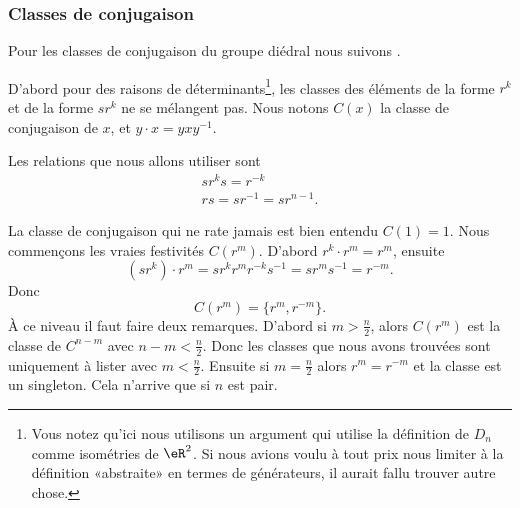 \subsubsection{Classes de conjugaison}
\label{subsubsecZQnBcgo}

Pour les classes de conjugaison du groupe diédral nous suivons \cite{HRIMAJJ}.

D'abord pour des raisons de déterminants\footnote{Vous notez qu'ici nous utilisons un argument qui utilise la définition de \( D_n\) comme isométries de \( \eR^2\). Si nous avions voulu à tout prix nous limiter à la définition «abstraite» en termes de générateurs, il aurait fallu trouver autre chose.}, les classes des éléments de la forme \( r^k\) et de la forme \( sr^k\) ne se mélangent pas. Nous notons \( C(x)\) la classe de conjugaison de \( x\), et \( y\cdot x=yxy^{-1}\).

Les relations que nous allons utiliser sont
\begin{subequations}
    \begin{align}
        sr^ks=r^{-k}\\
        rs=sr^{-1}=sr^{n-1}.
    \end{align}
\end{subequations}

La classe de conjugaison qui ne rate jamais est bien entendu \( C(1)={1}\). Nous commençons les vraies festivités \( C(r^{m})\). D'abord \( r^k\cdot r^m=r^m\), ensuite
\begin{equation}
    (sr^k)\cdot r^m=sr^kr^mr^{-k}s^{-1}=sr^ms^{-1}=r^{-m}.
\end{equation}
Donc
\begin{equation}    \label{EqVFfFxgi}
    C(r^m)=\{ r^m,r^{-m} \}.
\end{equation}
À ce niveau il faut faire deux remarques. D'abord si \( m>\frac{ n }{2}\), alors \( C(r^m)\) est la classe de \( C^{n-m}\) avec \( n-m<\frac{ n }{2}\). Donc les classes que nous avons trouvées sont uniquement à lister avec \( m<\frac{ n }{2}\). Ensuite si \( m=\frac{ n }{2}\) alors \( r^m=r^{-m}\) et la classe est un singleton. Cela n'arrive que si \( n\) est pair.

